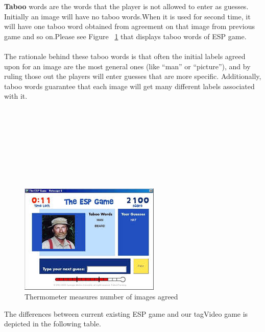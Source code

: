 \documentclass[12pt]{article}
\begin{document}
\textbf{Taboo} words are the words that the player is not allowed to enter as guesses. Initially an image will have no taboo words.When it is used for second time, it will have one taboo word obtained from agreement on that image from previous game and so on.Please see Figure ~\ref{taboo words} that displays taboo words of ESP game.\\ \\
The rationale behind these taboo words is that often
the initial labels agreed upon for an image are the most
general ones (like “man” or “picture”), and by ruling those
out the players will enter guesses that are more specific.
Additionally, taboo words guarantee that each image will
get many different labels associated with it.\\ \\ \\ \\ \\ \\ \\ \\ \\


\begin{figure}[htb]
\begin{center}
\includegraphics{images/esp_thermometer.jpeg}
\caption{Thermometer measures number of images agreed}
\label{taboo words}
\end{center}
\end{figure}

The differences between current existing ESP game and our tagVideo game is depicted in the following table. \\
\end{document}
